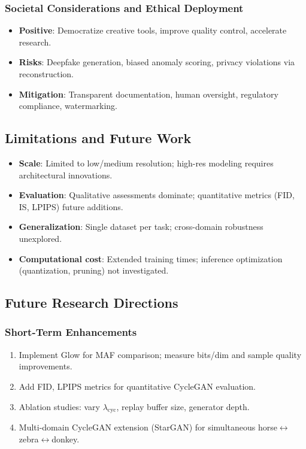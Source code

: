 \documentclass[conference]{IEEEtran}
\begin{document}
\subsubsection{Societal Considerations and Ethical Deployment}
\begin{itemize}
\item \textbf{Positive}: Democratize creative tools, improve quality control, accelerate research.
\item \textbf{Risks}: Deepfake generation, biased anomaly scoring, privacy violations via reconstruction.
\item \textbf{Mitigation}: Transparent documentation, human oversight, regulatory compliance, watermarking.
\end{itemize}

\subsection{Limitations and Future Work}
\begin{itemize}
\item \textbf{Scale}: Limited to low/medium resolution; high-res modeling requires architectural innovations.
\item \textbf{Evaluation}: Qualitative assessments dominate; quantitative metrics (FID, IS, LPIPS) future additions.
\item \textbf{Generalization}: Single dataset per task; cross-domain robustness unexplored.
\item \textbf{Computational cost}: Extended training times; inference optimization (quantization, pruning) not investigated.
\end{itemize}

\subsection{Future Research Directions}
\subsubsection{Short-Term Enhancements}
\begin{enumerate}
\item Implement Glow for MAF comparison; measure bits/dim and sample quality improvements.
\item Add FID, LPIPS metrics for quantitative CycleGAN evaluation.
\item Ablation studies: vary $\lambda_{\text{cyc}}$, replay buffer size, generator depth.
\item Multi-domain CycleGAN extension (StarGAN) for simultaneous horse$\leftrightarrow$zebra$\leftrightarrow$donkey.
\end{enumerate}
\end{document}
